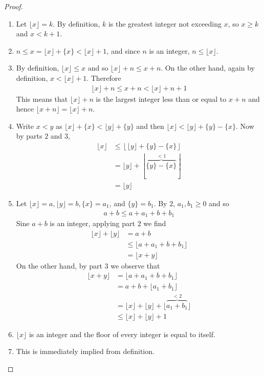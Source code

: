 \documentclass{subfile}
\begin{document}
\begin{proof}
	\begin{enumerate}[1.]
		\item Let $\lfloor x \rfloor=k$. By definition, $k$ is the greatest integer not exceeding $x$, so $x \geq k$ and $x<k+1$.
		\item $n \leq x = \lfloor x \rfloor + \{x\} <\lfloor x \rfloor +1$, and since $n$ is an integer, $n \leq \lfloor x \rfloor$.
		\item By definition, $\lfloor x \rfloor \leq x$ and so $\lfloor x \rfloor+n \leq x+n$. On the other hand, again by definition, $x < \lfloor x \rfloor+1$. Therefore
		\begin{align*}
			\lfloor x \rfloor +n \leq x+n < \lfloor x \rfloor + n+ 1
		\end{align*}
		This means that $\lfloor x \rfloor +n$ is the largest integer less than or equal to $x+n$ and hence $\lfloor x+n\rfloor=\lfloor x\rfloor+n$.
		\item Write $x<y$ as $\lfloor x \rfloor + \{x\} < \lfloor y \rfloor + \{y\}$ and then $\lfloor x \rfloor < \lfloor y \rfloor +\{y\}-\{x\}$. Now by parts $2$ and $3$,
		\begin{align*}
			\lfloor x \rfloor &\leq \left\lfloor \lfloor y \rfloor +\{y\}-\{x\}\right\rfloor \\
			&= \lfloor y \rfloor + \left\lfloor \overbrace{\{y\}-\{x\}}^{<1}\right\rfloor \\
			&= \lfloor y \rfloor
		\end{align*}
		\item Let $	\lfloor x \rfloor=a, \lfloor y \rfloor=b, \{x\}=a_1$, and $\{y\}=b_1$. By $2$, $a_1, b_1 \geq 0$ and so
		\begin{align*}
			a+b \leq a+a_1+b+b_1
		\end{align*}
		Sine $a+b$ is an integer, applying part $2$ we find
		\begin{align*}
			\lfloor x \rfloor + \lfloor y \rfloor &= a+b \\
			&\leq \lfloor a+a_1+b+b_1 \rfloor\\
			&= \lfloor x+y \rfloor
		\end{align*}
		On the other hand, by part $3$ we observe that
		\begin{align*}
			\lfloor x+y \rfloor &= \lfloor a+a_1+b+b_1 \rfloor\\
			&= a + b + \lfloor a_1+b_1 \rfloor\\
			&= \lfloor x \rfloor + \lfloor y \rfloor + \lfloor \overbrace{a_1+b_1}^{<2} \rfloor\\
			&\leq \lfloor x \rfloor + \lfloor y \rfloor + 1
		\end{align*}

		\item $\lfloor x\rfloor$ is an integer and the floor of every integer is equal to itself.
		\item This is immediately implied from definition.
	\end{enumerate}
\end{proof}
\end{document}
